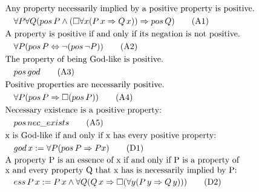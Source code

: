 \documentclass{llncs}
\begin{document}
\begin{align}
& \text{Any property necessarily implied by a positive property is positive.} \notag \\
& \quad \forall P \forall Q (pos\,P \wedge (\Box \forall x (P\,x \Rightarrow Q\,x)) \Rightarrow pos\,Q) \tag{A1} \\
& \text{A property is positive if and only if its negation is not positive.} \notag \\
& \quad \forall P (pos\,P \Leftrightarrow \neg (pos\,\neg P)) \tag{A2} \\
& \text{The property of being God-like is positive.} \notag \\
& \quad pos\,god \tag{A3} \\
& \text{Positive properties are necessarily positive.} \notag \\
& \quad \forall P (pos\,P \Rightarrow \Box (pos\,P))\tag{A4} \\
& \text{Necessary existence is a positive property:} \notag \\
& \quad pos\,nec\_exists \tag{A5} \\
& \text{x is God-like if and only if x has every positive property:} \notag \\
& \quad god\,x := \forall P (pos\,P \Rightarrow P x) \tag{D1} \\
& \parbox[c][2em][c]{0.8\textwidth}{A property P is an essence of x if and only if P is a property of x and every property Q that x has is necessarily implied by P:}\notag \\
& \quad ess\,P\,x := P\,x \wedge \forall Q (Q\,x \Rightarrow \Box (\forall y (P\,y \Rightarrow Q\,y))) \tag{D2}
\end{align}

\end{document}
